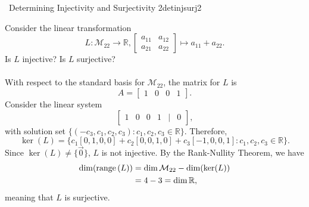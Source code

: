         \begin{example}{\Difficulty\,\Difficulty\,\,Determining Injectivity and Surjectivity 2}{detinjsurj2}

            Consider the linear transformation
            \begin{equation*}
                L:\mathcal{M}_{22}\to\mathbb{R},\begin{bmatrix} a_{11} & a_{12} \\ a_{21} & a_{22} \end{bmatrix}\mapsto a_{11}+a_{22}.
            \end{equation*}
            Is \(L\) injective? Is \(L\) surjective?
            \\
            \\
            With respect to the standard basis for \(\mathcal{M}_{22}\), the matrix for \(L\) is
            \begin{equation*}
                A=\begin{bmatrix}
                    1 & 0 & 0 & 1
                \end{bmatrix}.
            \end{equation*}
            Consider the linear system
            \begin{equation*}
                \begin{bmatrix}
                    1 & 0 & 0 & 1 & | & 0
                \end{bmatrix},
            \end{equation*}
            with solution set \(\{(-c_3,c_1,c_2,c_3):c_1,c_2,c_3\in\mathbb{R}\}\). Therefore, 
            \begin{equation*}
                \ker(L)=\{c_1[0,1,0,0]+c_2[0,0,1,0]+c_3[-1,0,0,1]:c_1,c_2,c_3\in\mathbb{R}\}.
            \end{equation*}     
            Since \(\ker(L)\neq\{\vec{0}\}\), \(L\) is not injective. By the Rank-Nullity Theorem, we have
            \begin{align*}
                \dim(\text{range\,}(L))&=\dim\mathcal{M}_{22}-\dim(\ker(L)) \\
                &=4-3=\dim\mathbb{R},
            \end{align*}
            meaning that \(L\) is surjective.
            
        \end{example}
        \pagebreak
